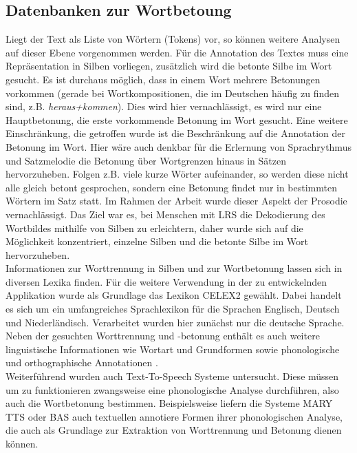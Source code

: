 \subsection{Datenbanken zur Wortbetoung}
\label{sec:forschung-database}

Liegt der Text als Liste von Wörtern (Tokens) vor, so können weitere Analysen auf dieser Ebene vorgenommen werden. Für die Annotation des Textes muss eine Repräsentation in Silben vorliegen, zusätzlich wird die betonte Silbe im Wort gesucht. Es ist durchaus möglich, dass in einem Wort mehrere Betonungen vorkommen (gerade bei Wortkompositionen, die im Deutschen häufig zu finden sind, z.B. \textit{heraus+kommen}). Dies wird hier vernachlässigt, es wird nur eine Hauptbetonung, die erste vorkommende Betonung im Wort gesucht. Eine weitere Einschränkung, die getroffen wurde ist die Beschränkung auf die Annotation der Betonung im Wort. Hier wäre auch denkbar für die Erlernung von Sprachrythmus und Satzmelodie die Betonung über Wortgrenzen hinaus in Sätzen hervorzuheben. Folgen z.B. viele kurze Wörter aufeinander, so werden diese nicht alle gleich betont gesprochen, sondern eine Betonung findet nur in bestimmten Wörtern im Satz statt. Im Rahmen der Arbeit wurde dieser Aspekt der Prosodie vernachlässigt. Das Ziel war es, bei Menschen mit LRS die Dekodierung des Wortbildes mithilfe von Silben zu erleichtern, daher wurde sich auf die Möglichkeit konzentriert, einzelne Silben und die betonte Silbe im Wort hervorzuheben.\\

Informationen zur Worttrennung in Silben und zur Wortbetonung lassen sich in diversen Lexika finden.  Für die weitere Verwendung in der zu entwickelnden Applikation wurde als Grundlage das Lexikon CELEX2 gewählt. Dabei handelt es sich um ein umfangreiches Sprachlexikon für die Sprachen Englisch, Deutsch und Niederländisch. Verarbeitet wurden hier zunächst nur die deutsche Sprache. Neben der gesuchten Worttrennung und -betonung enthält es auch weitere linguistische Informationen wie Wortart und Grundformen sowie phonologische und orthographische Annotationen  .
\\
Weiterführend wurden auch Text-To-Speech Systeme  untersucht. Diese müssen um zu funktionieren zwangsweise eine phonologische Analyse durchführen, also auch die Wortbetonung bestimmen. Beispielsweise liefern die Systeme MARY TTS oder BAS auch textuellen annotiere Formen ihrer phonologischen Analyse, die auch als Grundlage zur Extraktion von Worttrennung und Betonung dienen können.\\

